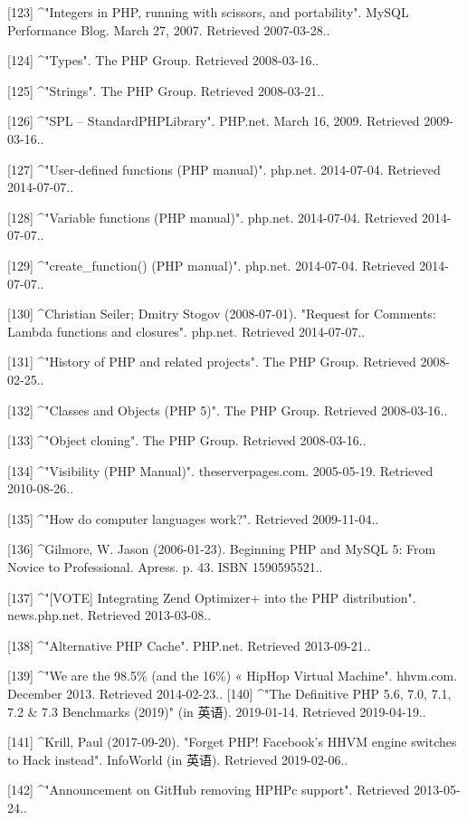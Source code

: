 [123]
^"Integers in PHP, running with scissors, and portability". MySQL Performance Blog. March 27, 2007. Retrieved 2007-03-28..

[124]
^"Types". The PHP Group. Retrieved 2008-03-16..

[125]
^"Strings". The PHP Group. Retrieved 2008-03-21..

[126]
^"SPL – StandardPHPLibrary". PHP.net. March 16, 2009. Retrieved 2009-03-16..

[127]
^"User-defined functions (PHP manual)". php.net. 2014-07-04. Retrieved 2014-07-07..

[128]
^"Variable functions (PHP manual)". php.net. 2014-07-04. Retrieved 2014-07-07..

[129]
^"create_function() (PHP manual)". php.net. 2014-07-04. Retrieved 2014-07-07..

[130]
^Christian Seiler; Dmitry Stogov (2008-07-01). "Request for Comments: Lambda functions and closures". php.net. Retrieved 2014-07-07..

[131]
^"History of PHP and related projects". The PHP Group. Retrieved 2008-02-25..

[132]
^"Classes and Objects (PHP 5)". The PHP Group. Retrieved 2008-03-16..

[133]
^"Object cloning". The PHP Group. Retrieved 2008-03-16..

[134]
^"Visibility (PHP Manual)". theserverpages.com. 2005-05-19. Retrieved 2010-08-26..

[135]
^"How do computer languages work?". Retrieved 2009-11-04..

[136]
^Gilmore, W. Jason (2006-01-23). Beginning PHP and MySQL 5: From Novice to Professional. Apress. p. 43. ISBN 1590595521..

[137]
^"[VOTE] Integrating Zend Optimizer+ into the PHP distribution". news.php.net. Retrieved 2013-03-08..

[138]
^"Alternative PHP Cache". PHP.net. Retrieved 2013-09-21..

[139]
^"We are the 98.5\% (and the 16\%) « HipHop Virtual Machine". hhvm.com. December 2013. Retrieved 2014-02-23..
[140]
^"The Definitive PHP 5.6, 7.0, 7.1, 7.2 & 7.3 Benchmarks (2019)" (in 英语). 2019-01-14. Retrieved 2019-04-19..

[141]
^Krill, Paul (2017-09-20). "Forget PHP! Facebook's HHVM engine switches to Hack instead". InfoWorld (in 英语). Retrieved 2019-02-06..

[142]
^"Announcement on GitHub removing HPHPc support". Retrieved 2013-05-24..

